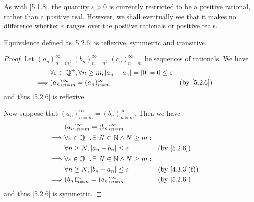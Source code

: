\begin{rmk}\label{5.2.7}
  As with \cref{5.1.8}, the quantity \(\varepsilon > 0\) is currently restricted to be a positive rational, rather than a positive real.
  However, we shall eventually see that it makes no difference whether \(\varepsilon\) ranges over the positive rationals or positive reals.
\end{rmk}

\begin{ac}\label{ac:5.2.1}
  Equivalence defined as \cref{5.2.6} is reflexive, symmetric and transitive.
\end{ac}

\begin{proof}
  Let \((a_n)_{n = m}^\infty\), \((b_n)_{n = m}^\infty\), \((c_n)_{n = m}^\infty\) be sequences of rationals.
  We have
  \begin{align*}
             & \forall \varepsilon \in \Q^+, \forall n \geq m, \abs{a_n - a_n} = \abs{0} = 0 \leq \varepsilon                 \\
    \implies & (a_n)_{n = m}^\infty = (a_n)_{n = m}^\infty                                                    &  & \by{5.2.6}
  \end{align*}
  and thus \cref{5.2.6} is reflexive.

  Now suppose that \((a_n)_{n = m}^\infty = (b_n)_{n = m}^\infty\).
  Then we have
  \begin{align*}
             & (a_n)_{n = m}^\infty = (b_n)_{n = m}^\infty                                                      \\
    \implies & \forall \varepsilon \in \Q^+, \exists\ N \in \N \land N \geq m:                                  \\
             & \forall n \geq N, \abs{a_n - b_n} \leq \varepsilon              &  & \by{5.2.6}                  \\
    \implies & \forall \varepsilon \in \Q^+, \exists\ N \in \N \land N \geq m:                                  \\
             & \forall n \geq N, \abs{b_n - a_n} \leq \varepsilon              &  & \text{(by \cref{4.3.3}(f))} \\
    \implies & (b_n)_{n = m}^\infty = (a_n)_{n = m}^\infty                     &  & \by{5.2.6}
  \end{align*}
  and thus \cref{5.2.6} is symmetric.


\end{proof}
